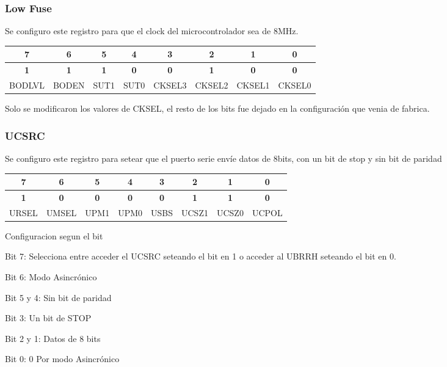 \documentclass[10pt,spanish,a4paper,openany,notitlepage]{article}
\begin{document}
\subsubsection{Low Fuse}
Se configuro este registro para que el clock del microcontrolador sea de 8MHz. 
\begin{center}
\begin{tabular}{|c|c|c|c|c|c|c|c|}\hline
7&6&5&4&3&2&1&0\\\hline
\textbf{1}&\textbf{1}&\textbf{1}&\textbf{0}&\textbf{0}&\textbf{1}&\textbf{0}&\textbf{0}\\\hline
BODLVL&BODEN&SUT1&SUT0&CKSEL3&CKSEL2&CKSEL1&CKSEL0\\\hline
\end{tabular}
\end{center}
Solo se modificaron los valores de CKSEL, el resto de los bits fue dejado en la configuración que venia de fabrica.

\subsubsection{UCSRC}\label{UCSRC}
Se configuro este registro para setear que el puerto serie envíe datos de 8bits, con un bit de stop y sin bit de paridad
\begin{center}
\begin{tabular}{|c|c|c|c|c|c|c|c|}\hline
7&6&5&4&3&2&1&0\\\hline
\textbf{1}&\textbf{0}&\textbf{0}&\textbf{0}&\textbf{0}&\textbf{1}&\textbf{1}&\textbf{0}\\\hline
URSEL&UMSEL&UPM1&UPM0&USBS&UCSZ1&UCSZ0&UCPOL\\\hline
\end{tabular}
\end{center}

\begin{description}
\item{Configuracion segun el bit}
\item{Bit 7}: Selecciona entre acceder el UCSRC seteando el bit en 1 o acceder al UBRRH seteando el bit en 0.
\item{Bit 6}: Modo Asincrónico
\item{Bit 5 y 4}: Sin bit de paridad
\item{Bit 3}: Un bit de STOP
\item{Bit 2 y 1}: Datos de 8 bits
\item{Bit 0}: 0 Por modo Asincrónico
\end{description}
\end{document}

